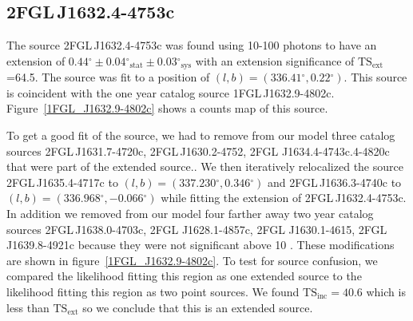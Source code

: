 \documentclass[12pt,preprint]{aastex}
\newcommand{\gev}{\text{GeV}\xspace}
\newcommand{\tsext}{{\ensuremath{\text{TS}_{\text{ext}}}}\xspace}
\newcommand{\tsinc}{\ensuremath{\text{TS}_{\text{inc}}}\xspace}
\newcommand{\sys}{\text{sys}\xspace}
\newcommand{\stat}{\text{stat}\xspace}
\renewcommand{\deg}{\ensuremath{^\circ}\xspace}
\begin{document}



\subsection{2FGL\,J1632.4-4753c}
\label{section_2FGL_J1632.4-4753c}



The source 2FGL\,J1632.4-4753c was found 
using 10-100 \gev photons to
have an extension of $0.44\deg\pm0.04\deg_\stat\pm0.03\deg_\sys$ 
with an extension
significance of \tsext=64.5.  The source was fit to a position of
$(l,b)=(336.41\deg,0.22\deg)$.  This source is coincident with the one
year catalog source 1FGL\,J1632.9-4802c.  Figure~\ref{1FGL_J1632.9-4802c}
shows a counts map of this source.

To get a good fit of the source, we had to remove from our model
three catalog sources 2FGL\,J1631.7-4720c, 2FGL\,J1630.2-4752,
2FGL J1634.4-4743c.4-4820c that were part of the extended source..
We then iteratively relocalized the source 2FGL\,J1635.4-4717c
to $(l,b)=(337.230\deg,0.346\deg)$ and 2FGL\,J1636.3-4740c to
$(l,b)=(336.968\deg,-0.066\deg)$ while fitting the extension of
2FGL\,J1632.4-4753c.  In addition we removed from our model four
farther away two year catalog sources 2FGL\,J1638.0-4703c, 2FGL
J1628.1-4857c, 2FGL  J1630.1-4615, 2FGL\,J1639.8-4921c because they
were not significant above 10 \gev.  These modifications are shown
in figure~\ref{1FGL_J1632.9-4802c}.  To test for source confusion,
we compared the likelihood fitting this region as one extended source
to the likelihood fitting this region as two point sources. We found
$\tsinc=40.6$ which is less than \tsext so we conclude
that this is an extended source.
\end{document}
